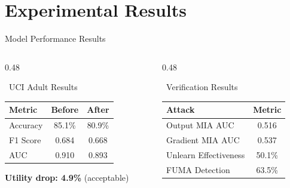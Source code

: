 \documentclass[aspectratio=169, 11pt]{beamer}
\begin{document}
\section{Experimental Results}

\begin{frame}{Model Performance Results}
    \begin{columns}[T]
        \begin{column}{0.48\textwidth}
            \begin{block}{\faChartBar\ UCI Adult Results}
                \begin{table}[]
                    \centering
                    \begin{tabular}{lcc}
                        \toprule
                        \textbf{Metric} & \textbf{Before} & \textbf{After} \\
                        \midrule
                        Accuracy & 85.1\% & 80.9\% \\
                        F1 Score & 0.684 & 0.668 \\
                        AUC & 0.910 & 0.893 \\
                        \bottomrule
                    \end{tabular}
                \end{table}
            \end{block}
            
            \textcolor{vflgreen}{\faCheckCircle} \textbf{Utility drop: 4.9\%} (acceptable)
        \end{column}
        
        \begin{column}{0.48\textwidth}
            \begin{block}{\faShieldAlt\ Verification Results}
                \begin{table}[]
                    \centering
                    \begin{tabular}{lc}
                        \toprule
                        \textbf{Attack} & \textbf{Metric} \\
                        \midrule
                        Output MIA AUC & 0.516 \\
                        Gradient MIA AUC & 0.537 \\
                        Unlearn Effectiveness & 50.1\% \\
                        FUMA Detection & 63.5\% \\
                        \bottomrule
                    \end{tabular}
                \end{table}
            \end{block}
        \end{column}
    \end{columns}
\end{frame}
\end{document}
